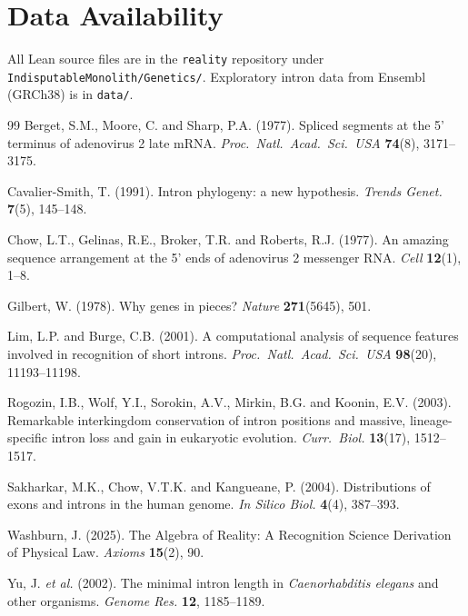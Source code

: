 \documentclass[11pt,twocolumn]{article}
\begin{document}
\section*{Data Availability}

All Lean source files are in the \texttt{reality} repository under
\texttt{IndisputableMonolith/Genetics/}. Exploratory intron data from
Ensembl (GRCh38) is in \texttt{data/}.

\begin{thebibliography}{99}
Berget, S.M., Moore, C. and Sharp, P.A. (1977). Spliced segments at the
5' terminus of adenovirus 2 late mRNA.
\textit{Proc.~Natl.~Acad.~Sci.~USA} \textbf{74}(8), 3171--3175.

Cavalier-Smith, T. (1991). Intron phylogeny: a new hypothesis.
\textit{Trends Genet.} \textbf{7}(5), 145--148.

Chow, L.T., Gelinas, R.E., Broker, T.R. and Roberts, R.J. (1977). An
amazing sequence arrangement at the 5' ends of adenovirus 2 messenger RNA.
\textit{Cell} \textbf{12}(1), 1--8.

Gilbert, W. (1978). Why genes in pieces?
\textit{Nature} \textbf{271}(5645), 501.

Lim, L.P. and Burge, C.B. (2001). A computational analysis of sequence
features involved in recognition of short introns.
\textit{Proc.~Natl.~Acad.~Sci.~USA} \textbf{98}(20), 11193--11198.

Rogozin, I.B., Wolf, Y.I., Sorokin, A.V., Mirkin, B.G. and Koonin, E.V.
(2003). Remarkable interkingdom conservation of intron positions and
massive, lineage-specific intron loss and gain in eukaryotic evolution.
\textit{Curr.~Biol.} \textbf{13}(17), 1512--1517.

Sakharkar, M.K., Chow, V.T.K. and Kangueane, P. (2004). Distributions
of exons and introns in the human genome.
\textit{In Silico Biol.} \textbf{4}(4), 387--393.

Washburn, J. (2025). The Algebra of Reality: A Recognition Science
Derivation of Physical Law. \textit{Axioms} \textbf{15}(2), 90.

Yu, J. \emph{et al.} (2002). The minimal intron length
in \textit{Caenorhabditis elegans} and other organisms.
\textit{Genome Res.} \textbf{12}, 1185--1189.
\end{thebibliography}
\end{document}
